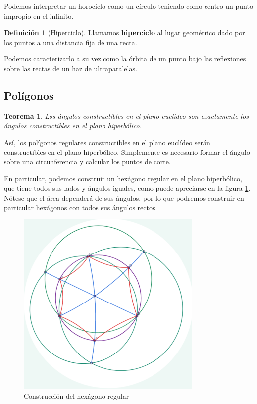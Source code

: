 \documentclass{article}
\theoremstyle{plain}
\newtheorem{theorem}{Teorema}
\theoremstyle{definition}
\newtheorem{definition}{Definición}
\theoremstyle{remark}
\begin{document}
Podemos interpretar un horociclo como un círculo teniendo como centro un
punto impropio en el infinito.

\begin{definition}[Hiperciclo]
  Llamamos \textbf{hiperciclo} al lugar geométrico dado por los puntos a
  una distancia fija de una recta.
\end{definition}

Podemos caracterizarlo a su vez como la órbita de un punto bajo las reflexiones
sobre las rectas de un haz de ultraparalelas.\cite{coxeter}



\subsection{Polígonos}
\begin{theorem}
  Los ángulos constructibles en el plano euclídeo son exactamente los ángulos
  constructibles en el plano hiperbólico. \cite{jagy95}
\end{theorem}

Así, los polígonos regulares constructibles en el plano euclídeo serán
constructibles en el plano hiperbólico. Simplemente es necesario
formar el ángulo sobre una circunferencia y calcular los puntos de corte.

En particular, podemos construir un hexágono regular en el plano
hiperbólico, que tiene todos sus lados y ángulos iguales, como puede
apreciarse en la figura \ref{hexagon}. Nótese que el área dependerá de
sus ángulos, por lo que podremos construir en particular hexágonos con
todos sus ángulos rectos

\begin{figure}[ht!]
\centering
\includegraphics[width=90mm]{./hexagon.png}
\caption{Construcción del hexágono regular \label{hexagon}}
\end{figure}
\end{document}
